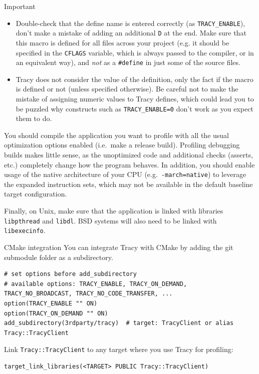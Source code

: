 \documentclass[hidelinks,titlepage,a4paper]{article}
\begin{document}
\begin{bclogo}[
noborder=true,
couleur=black!5,
logo=\bcbombe
]{Important}
\begin{itemize}
\item Double-check that the define name is entered correctly (as \texttt{TRACY\_ENABLE}), don't make a mistake of adding an additional \texttt{D} at the end. Make sure that this macro is defined for all files across your project (e.g. it should be specified in the \texttt{CFLAGS} variable, which is always passed to the compiler, or in an equivalent way), and \emph{not} as a \texttt{\#define} in just some of the source files.
\item Tracy does not consider the value of the definition, only the fact if the macro is defined or not (unless specified otherwise). Be careful not to make the mistake of assigning numeric values to Tracy defines, which could lead you to be puzzled why constructs such as \texttt{TRACY\_ENABLE=0} don't work as you expect them to do.
\end{itemize}
\end{bclogo}

You should compile the application you want to profile with all the usual optimization options enabled (i.e.~make a release build). Profiling debugging builds makes little sense, as the unoptimized code and additional checks (asserts, etc.) completely change how the program behaves. In addition, you should enable usage of the native architecture of your CPU (e.g.~\texttt{-march=native}) to leverage the expanded instruction sets, which may not be available in the default baseline target configuration.

Finally, on Unix, make sure that the application is linked with libraries \texttt{libpthread} and \texttt{libdl}. BSD systems will also need to be linked with \texttt{libexecinfo}.

\begin{bclogo}[
noborder=true,
couleur=black!5,
logo=\bclampe
]{CMake integration}
You can integrate Tracy with CMake by adding the git submodule folder as a subdirectory.

\begin{lstlisting}
# set options before add_subdirectory
# available options: TRACY_ENABLE, TRACY_ON_DEMAND, TRACY_NO_BROADCAST, TRACY_NO_CODE_TRANSFER, ...
option(TRACY_ENABLE "" ON)
option(TRACY_ON_DEMAND "" ON)
add_subdirectory(3rdparty/tracy)  # target: TracyClient or alias Tracy::TracyClient
\end{lstlisting}

Link \texttt{Tracy::TracyClient} to any target where you use Tracy for profiling:

\begin{lstlisting}
target_link_libraries(<TARGET> PUBLIC Tracy::TracyClient)
\end{lstlisting}
\end{bclogo}
\end{document}
